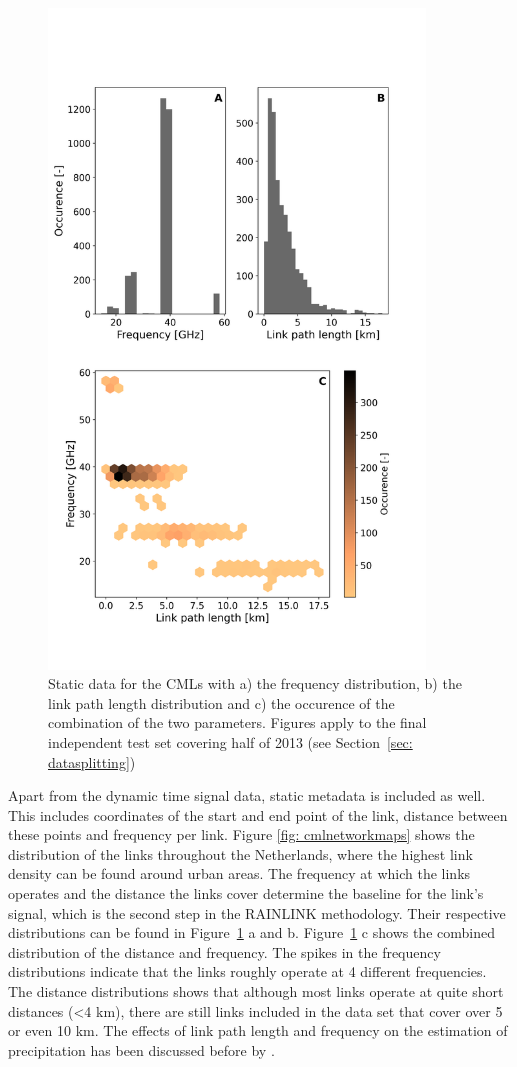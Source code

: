 \documentclass[twocolumn, 10pt, a4paper]{memoir}
\begin{document}
	\begin{figure}[h]
		\includegraphics[width=10cm]{val_freq_dist}
		\caption{Static data for the CMLs with a) the frequency distribution, b) the link path length distribution and c) the occurence of the combination of the two parameters. Figures apply to the final independent test set covering half of 2013 (see Section~\ref{sec: datasplitting})}
		\label{fig: CML validation}
	\end{figure}

	Apart from the dynamic time signal data, static metadata is included as well. This includes coordinates of the start and end point of the link, distance between these points and frequency per link. Figure \ref{fig: cmlnetworkmaps} shows the distribution of the links throughout the Netherlands, where the highest link density can be found around urban areas. The frequency at which the links operates and the distance the links cover determine the baseline for the link's signal, which is the second step in the RAINLINK methodology. Their respective distributions can be found in Figure~\ref{fig: CML validation} a and b. Figure~\ref{fig: CML validation} c shows the combined distribution of the distance and frequency. The spikes in the frequency distributions indicate that the links roughly operate at 4 different frequencies. The distance distributions shows that although most links operate at quite short distances (<4 km), there are still links included in the data set that cover over 5 or even 10 km. The effects of link path length and frequency on the estimation of precipitation has been discussed before by .	
	
\end{document}
